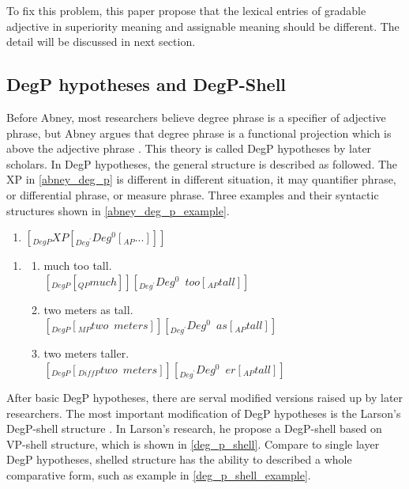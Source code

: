 \documentclass{ctexart}
\let \cite \parencite
\begin{document}
\noindent
To fix this problem, this paper propose that the lexical entries of gradable adjective in superiority meaning and assignable meaning should be different. The detail will be discussed in next section.

\subsection{DegP hypotheses and DegP-Shell}

\noindent
Before Abney, most researchers believe degree phrase is a specifier of adjective phrase, but Abney argues that degree phrase is a functional projection which is above the adjective phrase \cite{abney1987}. This theory is called DegP hypotheses by later scholars. In DegP hypotheses, the general structure is described as followed. The XP in \ref{abney_deg_p} is different in different situation, it may quantifier phrase, or differential phrase, or measure phrase. Three examples and their syntactic structures shown in \ref{abney_deg_p_example}.

\begin{enumerate}
    \item \label{abney_deg_p} $[_{DegP} XP [_{Deg^{\prime}}Deg^0[_{AP}...]]] $
\end{enumerate}

\begin{enumerate}
    \item \label{abney_deg_p_example}
    \begin{enumerate}
        \item \label{abney_deg_p_example_1}
        much too tall.\\
        $[_{DegP} [_{QP} much]] [_{Deg^{\prime}}Deg^0 \enspace too [_{AP}tall]] $
        \item \label{abney_deg_p_example_2}
        two meters as tall.\\
        $[_{DegP} [_{MP} two \enspace meters]] [_{Deg^{\prime}}Deg^0 \enspace as [_{AP}tall]] $
        \item \label{abney_deg_p_example_3}
        two meters taller.\\
        $[_{DegP} [_{DiffP} two \enspace meters]] [_{Deg^{\prime}}Deg^0 \enspace er [_{AP}tall]] $

    \end{enumerate}
\end{enumerate}

\noindent
After basic DegP hypotheses, there are serval modified versions raised up by later researchers. The most important modification of DegP hypotheses is the Larson's DegP-shell structure \cite{larson1991}. In Larson's research, he propose a DegP-shell based on VP-shell structure, which is shown in \ref{deg_p_shell}. Compare to single layer DegP hypotheses, shelled structure has the ability to described a whole comparative form, such as example in \ref{deg_p_shell_example}.
\end{document}
